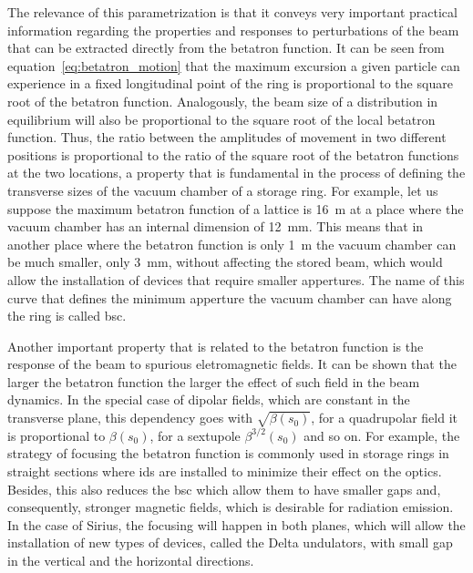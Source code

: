 	The relevance of this parametrization is that it conveys very important practical information regarding the properties and responses to perturbations of the beam that can be extracted directly from the betatron function. It can be seen from equation~\eqref{eq:betatron_motion} that the maximum excursion a given particle can experience in a fixed longitudinal point of the ring is proportional to the square root of the betatron function. Analogously, the beam size of a distribution in equilibrium will also be proportional to the square root of the local betatron function. Thus, the ratio between the amplitudes of movement in two different positions is proportional to the ratio of the square root of the betatron functions at the two locations, a property that is fundamental in the process of defining the transverse sizes of the vacuum chamber of a storage ring. For example, let us suppose the maximum betatron function of a lattice is \SI{16}{\meter} at a place where the vacuum chamber has an internal dimension of \SI{12}{\milli\meter}. This means that in another place where the betatron function is only \SI{1}{\meter} the vacuum chamber can be much smaller, only \SI{3}{\milli\meter}, without affecting the stored beam, which would allow the installation of devices that require smaller appertures. The name of this curve that defines the minimum apperture the vacuum chamber can have along the ring is called \gls{bsc}.

	Another important property that is related to the betatron function is the response of the beam to spurious eletromagnetic fields. It can be shown that the larger the betatron function the larger the effect of such field in the beam dynamics. In the special case of dipolar fields, which are constant in the transverse plane, this dependency goes with $\sqrt{\beta(s_0)}$, for a quadrupolar field it is proportional to $\beta(s_0)$, for a sextupole $\beta^{3/2}(s_0)$ and so on. For example, the strategy of focusing the betatron function is commonly used in storage rings in straight sections where \glspl{id} are installed to minimize their effect on the optics. Besides, this also reduces the \gls{bsc} which allow them to have smaller gaps and, consequently, stronger magnetic fields, which is desirable for radiation emission. In the case of Sirius, the focusing will happen in both planes, which will allow the installation of new types of devices, called the Delta undulators, with small gap in the vertical and the horizontal directions.

